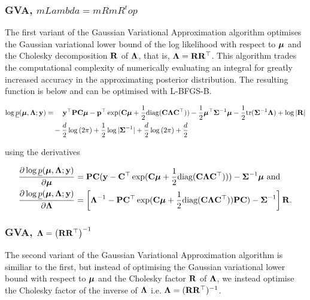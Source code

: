 \documentclass{article}[12pt]
\begin{document}
\subsubsection{GVA, $mLambda = mR mR^top$}

The first variant of the Gaussian Variational Approximation algorithm optimises the Gaussian variational lower
bound of the log likelihood with respect to ${\boldsymbol \mu}$ and the Cholesky decomposition ${\bf R}$ of ${\boldsymbol \Lambda}$, that
is, ${\boldsymbol \Lambda} = {\bf R} {\bf R}^\top$. This algorithm trades the computational complexity of numerically evaluating an
integral for greatly increased accuracy in the approximating posterior distribution. The resulting function is
below and can be optimised with L-BFGS-B.

\begin{align*}
\log \underline{p}({\boldsymbol \mu}, {\boldsymbol \Lambda}; {\bf y}) &= \quad {\bf y}^\top{\bf P} {\bf C} {\boldsymbol\mu} - {\bf p}^\top \exp({\bf C} {\boldsymbol \mu} + {\frac{1}{2}} \text{diag}({\bf C} {\boldsymbol \Lambda} {\bf C}^\top)) - {\frac{1}{2}} {\boldsymbol \mu}^\top {\boldsymbol\Sigma}^{-1} {\boldsymbol \mu} - {\frac{1}{2}} \text{tr}{({\boldsymbol\Sigma}^{-1} {\boldsymbol\Lambda})} + \log{|{\bf R}|} \\
&\quad - \frac{d}{2} \log{(2 \pi)} + {\frac{1}{2}} \log{|{\boldsymbol\Sigma}^{-1}|} + \frac{d}{2} \log{(2 \pi)} + \frac{d}{2} \\
\end{align*}

using the derivatives

\begin{align*}
\frac{\partial \log \underline{p}({\boldsymbol \mu}, {\boldsymbol \Lambda}; {\bf y})}{\partial {\boldsymbol\mu}} &= {\bf P} {\bf C} ({\bf y} - {\bf C}^\top \exp({\bf C} {\boldsymbol \mu} + {\frac{1}{2}} \text{diag}{({\bf C}{\boldsymbol\Lambda}{\bf C}^\top)})) - {\boldsymbol \Sigma}^{-1} {\boldsymbol \mu} \text{ and}\\
\frac{\partial \log \underline{p}({\boldsymbol \mu}, {\boldsymbol \Lambda}; {\bf y})}{\partial {\boldsymbol\Lambda}} &= \left [{\boldsymbol \Lambda}^{-1} - {\bf P} {\bf C}^\top \exp({\bf C} {\boldsymbol \mu} + {\frac{1}{2}} \text{diag}({\bf C} {\boldsymbol \Lambda} {\bf C}^\top)) {\bf P} {\bf C}) - {\boldsymbol \Sigma}^{-1} \right ] {\bf R}.
\end{align*}

\subsubsection{GVA, ${\boldsymbol \Lambda} = \left ({\bf R} {\bf R}^\top \right )^{-1}$}

The second variant of the Gaussian Variational Approximation algorithm is similiar to the first, but instead
of optimising the Gaussian variational lower bound with respect to ${\boldsymbol \mu}$ and the Cholesky factor ${\bf R}$ of
${\boldsymbol \Lambda}$, we instead optimise the Cholesky factor of the inverse of ${\boldsymbol \Lambda}$ i.e. ${\boldsymbol \Lambda} = ({\bf R}
{\bf R}^\top)^{-1}$.
\end{document}
